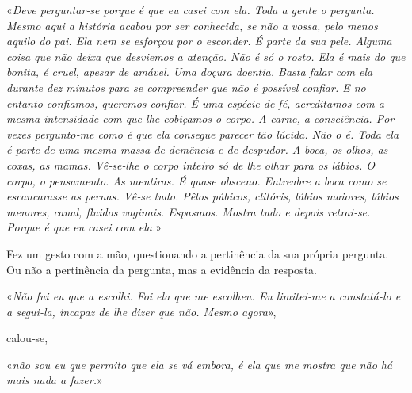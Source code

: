 «\emph{Deve perguntar­‑se porque é que eu casei com ela. Toda a gente o
pergunta. Mesmo aqui a história acabou por ser conhecida, se não a
vossa, pelo menos aquilo do pai. Ela nem se esforçou por o esconder. É
parte da sua pele. Alguma coisa que não deixa que desviemos a atenção.
Não é só o rosto. Ela é mais do que bonita, é cruel, apesar de amável.
Uma doçura doentia. Basta falar com ela durante dez minutos para se
compreender que não é possível confiar. E no entanto confiamos, queremos
confiar. É uma espécie de fé, acreditamos com a mesma intensidade com
que lhe cobiçamos o corpo. A carne, a consciência. Por vezes
pergunto­‑me como é que ela consegue parecer tão lúcida. Não o é. Toda
ela é parte de uma mesma massa de demência e de despudor. A boca, os
olhos, as coxas, as mamas. Vê­‑se­‑lhe o corpo inteiro só de lhe olhar
para os lábios. O corpo, o pensamento. As mentiras. É quase obsceno.
Entreabre a boca como se escancarasse as pernas. Vê­‑se tudo. Pêlos
púbicos, clitóris, lábios maiores, lábios menores, canal, fluidos
vaginais. Espasmos. Mostra tudo e depois retrai­‑se. Porque é que eu
casei com ela.}»

Fez um gesto com a mão, questionando a pertinência da sua própria
pergunta. Ou não a pertinência da pergunta, mas a evidência da resposta.

«\emph{Não fui eu que a escolhi. Foi ela que me escolheu. Eu limitei­‑me
a constatá­‑lo e a segui­‑la, incapaz de lhe dizer que não. Mesmo
agora}»,

calou­‑se,

«\emph{não sou eu que permito que ela se vá embora, é ela que me mostra
que não há mais nada a fazer.}»

